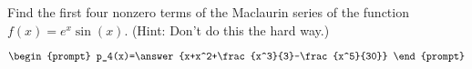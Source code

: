 \documentclass{ximera}
\author{Gregory Hartman \and Matthew Carr}
\begin{document}
\begin{exercise}






Find the first four nonzero terms of the Maclaurin series of the function $f(x)=e^{x}\sin(x)$. (Hint: Don't do this the hard way.)

\[
\begin{prompt}
p_4(x)=\answer{x+x^2+\frac{x^3}{3}-\frac{x^5}{30}}
\end{prompt}
\]

\end{exercise}
\end{document}
